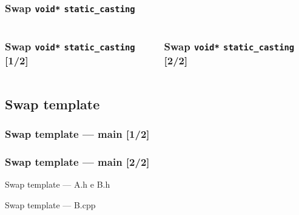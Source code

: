 \documentclass[xcolor={dvipsnames, svgnames, x11names, table}, 10pt]{beamer}
\begin{document}
\subsubsection{Swap \texttt{void*} \texttt{static\_casting}}

\begin{frame}[t, fragile]

\begin{columns}
    \column{\dimexpr\paperwidth-30pt}
    
    \frametitle<1>{Swap \texttt{void*} \alert{\texttt{static\_casting}} [1/2]}
    
    \frametitle<2>{Swap \texttt{void*} \alert{\texttt{static\_casting}} [2/2]}
    

\end{columns}

\end{frame}

\subsection{Swap template}

\begin{frame}[t, fragile]

\frametitle<1>{Swap template --- \alert{main} [1/2]}

\frametitle<2>{Swap template --- \alert{main} [2/2]}

\end{frame}

\begin{frame}[t, fragile]{Swap template --- \alert{A.h} e \alert{B.h}}


\end{frame}

\begin{frame}[t, fragile]{Swap template --- \alert{B.cpp}}


\end{frame}
\end{document}
